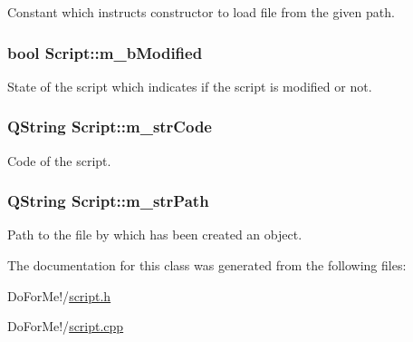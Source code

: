 Constant which instructs constructor to load file from the given path. 

\hypertarget{class_script_a257a0787624a8e8c067f3b2c4805f6fa}{
\subsubsection[{m\-\_\-b\-Modified}]{\setlength{\rightskip}{0pt plus 5cm}bool Script\-::m\-\_\-b\-Modified\hspace{0.3cm}{\ttfamily [private]}}}\label{class_script_a257a0787624a8e8c067f3b2c4805f6fa}


State of the script which indicates if the script is modified or not. 

\hypertarget{class_script_a712090ac7231f4948abf11964d9adab7}{
\subsubsection[{m\-\_\-str\-Code}]{\setlength{\rightskip}{0pt plus 5cm}Q\-String Script\-::m\-\_\-str\-Code\hspace{0.3cm}{\ttfamily [private]}}}\label{class_script_a712090ac7231f4948abf11964d9adab7}


Code of the script. 

\hypertarget{class_script_a6aa79179662c0220e0ad05a7f2985a0b}{
\subsubsection[{m\-\_\-str\-Path}]{\setlength{\rightskip}{0pt plus 5cm}Q\-String Script\-::m\-\_\-str\-Path\hspace{0.3cm}{\ttfamily [private]}}}\label{class_script_a6aa79179662c0220e0ad05a7f2985a0b}


Path to the file by which has been created an object. 



The documentation for this class was generated from the following files\-:\begin{DoxyCompactItemize}
\item 
Do\-For\-Me!/\hyperlink{script_8h}{script.\-h}\item 
Do\-For\-Me!/\hyperlink{script_8cpp}{script.\-cpp}\end{DoxyCompactItemize}
